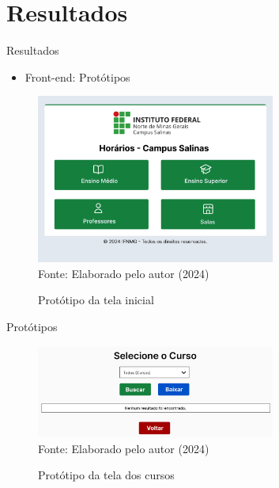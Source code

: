 \section{Resultados}

\begin{frame}{Resultados}
    \begin{itemize}
		\item Front-end: Protótipos \vspace{0.5cm}
	\end{itemize}
    \begin{figure}
        \centering
        \vspace{-0.8cm}
        \caption{Protótipo da tela inicial}
        \vspace{-0.2cm}
        \includegraphics[width=0.7\textwidth]{figuras/proto-1.png}
        \\ %
        \small Fonte: Elaborado pelo autor (2024)
    \end{figure}
\end{frame}

\begin{frame}{Protótipos}
    \begin{figure}
        \centering
        \vspace{-0.5cm}
        \caption{Protótipo da tela dos cursos}
        \vspace{-0.2cm}
        \includegraphics[width=0.7\textwidth]{figuras/proto-2.png}
        \\ %
        \small Fonte: Elaborado pelo autor (2024)
    \end{figure}
\end{frame}

